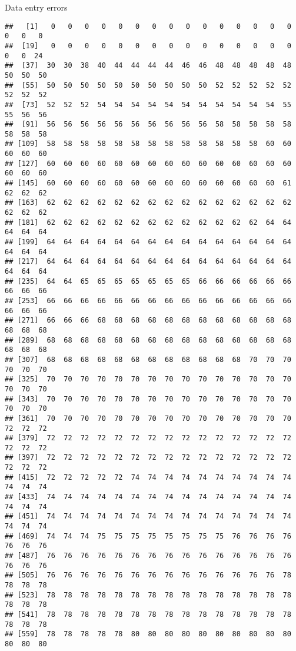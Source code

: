 \begin{frame}[fragile]{Data entry errors}
\begin{verbatim}
##   [1]   0   0   0   0   0   0   0   0   0   0   0   0   0   0   0   0   0   0
##  [19]   0   0   0   0   0   0   0   0   0   0   0   0   0   0   0   0   0  24
##  [37]  30  30  38  40  44  44  44  44  46  46  48  48  48  48  48  50  50  50
##  [55]  50  50  50  50  50  50  50  50  50  50  52  52  52  52  52  52  52  52
##  [73]  52  52  52  54  54  54  54  54  54  54  54  54  54  54  55  55  56  56
##  [91]  56  56  56  56  56  56  56  56  56  56  58  58  58  58  58  58  58  58
## [109]  58  58  58  58  58  58  58  58  58  58  58  58  58  60  60  60  60  60
## [127]  60  60  60  60  60  60  60  60  60  60  60  60  60  60  60  60  60  60
## [145]  60  60  60  60  60  60  60  60  60  60  60  60  60  60  61  62  62  62
## [163]  62  62  62  62  62  62  62  62  62  62  62  62  62  62  62  62  62  62
## [181]  62  62  62  62  62  62  62  62  62  62  62  62  62  64  64  64  64  64
## [199]  64  64  64  64  64  64  64  64  64  64  64  64  64  64  64  64  64  64
## [217]  64  64  64  64  64  64  64  64  64  64  64  64  64  64  64  64  64  64
## [235]  64  64  65  65  65  65  65  65  65  66  66  66  66  66  66  66  66  66
## [253]  66  66  66  66  66  66  66  66  66  66  66  66  66  66  66  66  66  66
## [271]  66  66  66  68  68  68  68  68  68  68  68  68  68  68  68  68  68  68
## [289]  68  68  68  68  68  68  68  68  68  68  68  68  68  68  68  68  68  68
## [307]  68  68  68  68  68  68  68  68  68  68  68  68  70  70  70  70  70  70
## [325]  70  70  70  70  70  70  70  70  70  70  70  70  70  70  70  70  70  70
## [343]  70  70  70  70  70  70  70  70  70  70  70  70  70  70  70  70  70  70
## [361]  70  70  70  70  70  70  70  70  70  70  70  70  70  70  70  72  72  72
## [379]  72  72  72  72  72  72  72  72  72  72  72  72  72  72  72  72  72  72
## [397]  72  72  72  72  72  72  72  72  72  72  72  72  72  72  72  72  72  72
## [415]  72  72  72  72  72  74  74  74  74  74  74  74  74  74  74  74  74  74
## [433]  74  74  74  74  74  74  74  74  74  74  74  74  74  74  74  74  74  74
## [451]  74  74  74  74  74  74  74  74  74  74  74  74  74  74  74  74  74  74
## [469]  74  74  74  75  75  75  75  75  75  75  75  76  76  76  76  76  76  76
## [487]  76  76  76  76  76  76  76  76  76  76  76  76  76  76  76  76  76  76
## [505]  76  76  76  76  76  76  76  76  76  76  76  76  76  76  78  78  78  78
## [523]  78  78  78  78  78  78  78  78  78  78  78  78  78  78  78  78  78  78
## [541]  78  78  78  78  78  78  78  78  78  78  78  78  78  78  78  78  78  78
## [559]  78  78  78  78  78  80  80  80  80  80  80  80  80  80  80  80  80  80

\end{verbatim}
\end{frame}
